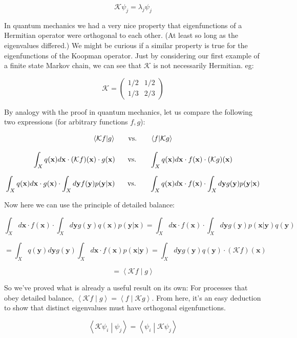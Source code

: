 \documentclass[]{article}
\newcommand{\braket}[2]{\left\langle #1 \middle| #2 \right\rangle}
\newcommand{\w}[1]{\mathbf{#1}}
\newcommand{\Kp}{\mathcal{K}}
\begin{document}
$$
\Kp \psi_j = \lambda_j \psi_j
$$

In quantum mechanics we had a very nice property that eigenfunctions of a Hermitian operator were orthogonal to each other. (At least so long as the eigenvalues differed.) We might be curious if a similar property is true for the eigenfunctions of the Koopman operator. Just by considering our first example of a finite state Markov chain, we can see that $\Kp$ is not necessarily Hermitian. eg:

$$
\Kp = \begin{pmatrix}
	1/2 & 1/2\\
	1/3 & 2/3
\end{pmatrix}
$$

By analogy with the proof in quantum mechanics, let us compare the following two expressions (for arbitrary functions $f, g$):

$$
\braket{\Kp f}{g}
\hspace{0.5cm}\text{  vs.  }\hspace{0.5cm}
\braket{f}{\Kp g}
$$

$$
\int_X q(\w{x})d\w{x} \cdot (\Kp f)(\w{x}) \cdot  g(\w{x})
\hspace{0.5cm}\text{  vs.  }\hspace{0.5cm}
\int_X q(\w{x})d\w{x} \cdot f(\w{x}) \cdot (\Kp  g)(\w{x})
$$

$$
\int_X q(\w{x})d\w{x} \cdot  g(\w{x}) \cdot \int_X d\w{y} f(\w{y})p(\w{y} | \w{x})
\hspace{0.5cm}\text{  vs.  }\hspace{0.5cm}
\int_X q(\w{x})d\w{x} \cdot f(\w{x}) \cdot \int_X d\w{y} g(\w{y})p(\w{y} | \w{x})
$$

Now here we can use the principle of detailed balance:

$$
\int_X d\w{x} \cdot f(\w{x}) \cdot \int_X d\w{y} g(\w{y}) q(\w{x}) p(\w{y} | \w{x})
= \int_X d\w{x} \cdot f(\w{x}) \cdot
\int_X d\w{y} g(\w{y})p(\w{x}|\w{y})q(\w{y})
$$

$$
=
\int_X q(\w{y}) d\w{y} g(\w{y})
\int_X d\w{x} \cdot f(\w{x}) p(\w{x}|\w{y})
= \int_X d\w{y} g(\w{y})q(\w{y})\cdot (\Kp f)(\w{x})
$$

$$
= \braket{\Kp f}{ g}
$$

So we've proved what is already a useful result on its own: For processes that obey detailed balance, $\braket{\Kp f}{g} = \braket{f}{\Kp g}$. From here, it's an easy deduction to show that distinct eigenvalues must have orthogonal eigenfunctions.

$$
\braket{\Kp \psi_i}{\psi_j}
= \braket{\psi_i}{\Kp\psi_j}
$$
\end{document}
